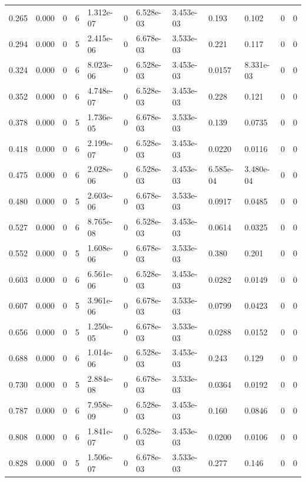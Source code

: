 \documentclass[preview]{standalone}
\begin{document}
{{\begin{tabular}{L{1.2cm}C{1.2cm} C{0.3cm}C{0.5cm} C{1.4cm}C{1.4cm} C{1.4cm}C{1.4cm} C{1.6cm}C{1.6cm} C{1.6cm}C{1.6cm}}
  0.265  &  0.000  & 0     &  6 &  1.312e-07  & 0  &  6.528e-03&   3.453e-03& 0.193 & 0.102   &  0 & 0  \\ 
  0.294  &  0.000  & 0     &  5 &  2.415e-06  & 0  &  6.678e-03&   3.533e-03& 0.221 & 0.117   &  0 & 0  \\ 
  0.324  &  0.000  & 0     &  6 &  8.023e-06  & 0  &  6.528e-03&   3.453e-03& 0.0157 & 8.331e-03   &  0 & 0  \\ 
  0.352  &  0.000  & 0     &  6 &  4.748e-07  & 0  &  6.528e-03&   3.453e-03& 0.228 & 0.121   &  0 & 0  \\ 
  0.378  &  0.000  & 0     &  5 &  1.736e-05  & 0  &  6.678e-03&   3.533e-03& 0.139 & 0.0735   &  0 & 0  \\ 
  0.418  &  0.000  & 0     &  6 &  2.199e-07  & 0  &  6.528e-03&   3.453e-03& 0.0220 & 0.0116   &  0 & 0  \\ 
  0.475  &  0.000  & 0     &  6 &  2.028e-06  & 0  &  6.528e-03&   3.453e-03& 6.585e-04 & 3.480e-04   &  0 & 0  \\ 
  0.480  &  0.000  & 0     &  5 &  2.603e-06  & 0  &  6.678e-03&   3.533e-03& 0.0917 & 0.0485   &  0 & 0  \\ 
  0.527  &  0.000  & 0     &  6 &  8.765e-08  & 0  &  6.528e-03&   3.453e-03& 0.0614 & 0.0325   &  0 & 0  \\ 
  0.552  &  0.000  & 0     &  5 &  1.608e-06  & 0  &  6.678e-03&   3.533e-03& 0.380 & 0.201   &  0 & 0  \\ 
  0.603  &  0.000  & 0     &  6 &  6.561e-06  & 0  &  6.528e-03&   3.453e-03& 0.0282 & 0.0149   &  0 & 0  \\ 
  0.607  &  0.000  & 0     &  5 &  3.961e-06  & 0  &  6.678e-03&   3.533e-03& 0.0799 & 0.0423   &  0 & 0  \\ 
  0.656  &  0.000  & 0     &  5 &  1.250e-05  & 0  &  6.678e-03&   3.533e-03& 0.0288 & 0.0152   &  0 & 0  \\ 
  0.688  &  0.000  & 0     &  6 &  1.014e-06  & 0  &  6.528e-03&   3.453e-03& 0.243 & 0.129   &  0 & 0  \\ 
  0.730  &  0.000  & 0     &  5 &  2.884e-08  & 0  &  6.678e-03&   3.533e-03& 0.0364 & 0.0192   &  0 & 0  \\ 
  0.787  &  0.000  & 0     &  6 &  7.958e-09  & 0  &  6.528e-03&   3.453e-03& 0.160 & 0.0846   &  0 & 0  \\ 
  0.808  &  0.000  & 0     &  6 &  1.841e-07  & 0  &  6.528e-03&   3.453e-03& 0.0200 & 0.0106   &  0 & 0  \\ 
  0.828  &  0.000  & 0     &  5 &  1.506e-07  & 0  &  6.678e-03&   3.533e-03& 0.277 & 0.146   &  0 & 0  \\ 

\end{tabular}}}
\end{document}
